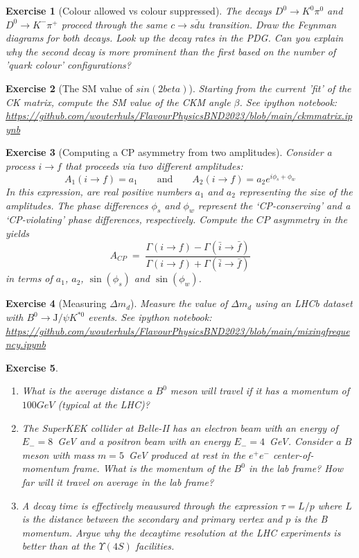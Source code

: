 \documentclass[12pt]{article}
\newcommand{\nbexercise}[1]{\url{https://github.com/wouterhuls/FlavourPhysicsBND2023/blob/main/#1}}
\newtheorem{homeworkexercise}{Exercise}
\newenvironment{enumexercise}{
  \renewcommand{\labelenumi}{\bfseries{(\alph{enumi})}}
  \leavevmode\begin{enumerate}}{\end{enumerate}\vspace{5pt}}
\newcommand{\jpsi}{\ensuremath{\mathrm{J/}\psi}}
\begin{document}
\begin{homeworkexercise}[Colour allowed vs colour suppressed]
  The decays $D^0 \to K^0 \pi^0$ and $D^0 \to K^- \pi^+$ proceed through the same $c \to s \bar{d} u$ transition. Draw the Feynman diagrams for both decays. Look up the decay rates in the PDG. Can you explain why the second decay is more prominent than the first based on the number of 'quark colour' configurations?
\end{homeworkexercise}

\begin{homeworkexercise}[The SM value of $sin(2beta)$]
  Starting from the current 'fit' of the CK matrix, compute the SM value of the CKM angle $\beta$.
  See ipython notebook: \nbexercise{ckmmatrix.ipynb}
\end{homeworkexercise}

\begin{homeworkexercise}[Computing a CP asymmetry from two amplitudes]
  Consider a process $ i \to f $ that proceeds via two different amplitudes:
  \[
    A_1(i \to f) = a_1 \qquad \text{and} \qquad
    A_2(i \to f) = a_2 e^{i \phi_s + \phi_w}
  \]
  In this expression, are real positive numbers $a_1$ and $a_2$ representing the size of the amplitudes. The phase differences $\phi_s$ and $\phi_w$ represent the `CP-conserving' and a `CP-violating' phase differences, respectively.   Compute the $CP$ asymmetry in the yields
  \[
    A_{CP} \; = \;
    \frac{ \Gamma(i\to f) - \Gamma( \bar{i} \to \bar{f} ) }
    { \Gamma(i\to f) + \Gamma( \bar{i} \to \bar{f} ) }
  \]
  in terms of $a_1$, $a_2$, $\sin(\phi_s)$ and $\sin(\phi_w)$.
\end{homeworkexercise}


\begin{homeworkexercise}[Measuring $\Delta m_d$]
  Measure the value of $\Delta m_d$ using an LHCb dataset with $B^0 \to \jpsi K^{*0}$ events. See ipython notebook: \nbexercise{mixingfrequency.ipynb}  
\end{homeworkexercise}

\begin{homeworkexercise}
  \begin{enumexercise}
  \item What is the average distance a $B^0$ meson will travel if it has a momentum of $100 GeV$ (typical at the LHC)?
  \item The SuperKEK collider at Belle-II has an electron beam with an energy of $E_- = 8$~GeV and a positron beam with an energy $E_- = 4$~GeV. Consider a $B$ meson with mass $m=5$~GeV produced at rest in the $e^+ e^-$ center-of-momentum frame. What is the momentum of the $B^0$ in the lab frame? How far will it travel on average in the lab frame?
  \item A decay time is effectively meausured through the expression $\tau = L / p$ where $L$ is the distance between the secondary and primary vertex and $p$ is the B momentum. Argue why the decaytime resolution at the LHC experiments is better than at the $\Upsilon(4S)$ facilities.
  \end{enumexercise}
\end{homeworkexercise}
  
\end{document}
